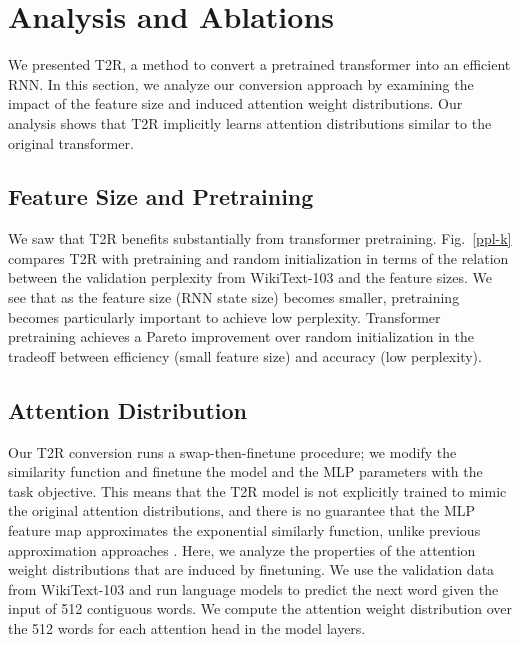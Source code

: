 \documentclass[11pt,a4paper]{article}
\newcommand{\TRNN}{T2R\xspace}
\begin{document}
\section{Analysis and Ablations}
We presented \TRNN, a method to convert a pretrained transformer into an efficient RNN.
In this section, we analyze our conversion approach by examining the impact of the feature size and induced attention weight distributions.
Our analysis shows that \TRNN implicitly learns attention distributions similar to the original transformer.





\subsection{Feature Size and Pretraining}
We saw that \TRNN benefits substantially from transformer pretraining.
Fig.\ \ref{ppl-k} compares \TRNN with pretraining and random initialization in terms of the relation between the validation perplexity from WikiText-103 and the feature sizes.
We see that as the feature size (RNN state size) becomes smaller, pretraining becomes particularly important to achieve low perplexity.
Transformer pretraining achieves a Pareto improvement over random initialization in the tradeoff between efficiency (small feature size) and accuracy (low perplexity).




\subsection{Attention Distribution}
\label{sec:attn_dist}
Our \TRNN conversion runs a swap-then-finetune procedure; we modify the similarity function and finetune the model and the MLP parameters with the task objective.
This means that the \TRNN model is not explicitly trained to mimic the original attention distributions, and there is no guarantee that the MLP feature map approximates the exponential similarly function, unlike previous approximation approaches \cite{RFA, performer}.
Here, we analyze the properties of the attention weight distributions that are induced by finetuning.
We use the validation data from WikiText-103 and run language models to predict the next word given the input of 512 contiguous words.
We compute the attention weight distribution over the 512 words for each attention head in the model layers.
\end{document}
